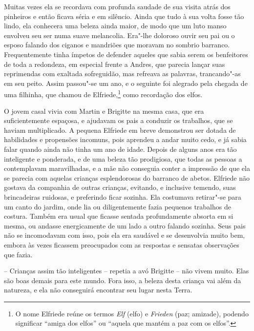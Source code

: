 Muitas vezes ela se recordava com profunda saudade de sua visita atrás
dos pinheiros e então ficava séria e em silêncio. Ainda que tudo à sua
volta fosse tão lindo, ela conhecera uma beleza ainda maior, de modo
que um luto manso envolveu seu ser numa suave melancolia. Era"-lhe
doloroso ouvir seu pai ou o esposo falando dos ciganos e mandriões que
moravam no sombrio barranco. Frequentemente tinha ímpetos de defender
aqueles que sabia serem os benfeitores de toda a redondeza, em especial
frente a Andres, que parecia lançar suas reprimendas com exaltada
sofreguidão, mas refreava as palavras, trancando"-as em seu peito. Assim
passou"-se um ano, e o seguinte foi alegrado pela chegada de uma
filhinha, que chamou de Elfriede,\footnote{ O nome Elfriede 
reúne os termos \textit{Elf} (elfo) e
\textit{Frieden} (paz; amizade), podendo significar ``amiga dos elfos'' ou
``aquela que mantém a paz com os elfos''.} como recordação dos elfos.

 O jovem casal vivia com Martin e Brigitte na mesma casa, que era
suficientemente espaçosa, e ajudavam os pais a conduzir os trabalhos,
que se haviam multiplicado. A pequena Elfriede em breve demonstrou ser
dotada de habilidades e propensões incomuns, pois aprendeu a andar
muito cedo, e já sabia falar quando ainda não tinha um ano de idade.
Depois de alguns anos era tão inteligente e ponderada, e de uma beleza
tão prodigiosa, que todas as pessoas a contemplavam maravilhadas, e a mãe
não conseguia conter a impressão de que ela se parecia com aquelas
crianças esplendorosas do barranco de abetos. Elfriede não gostava da
companhia de outras crianças, evitando, e inclusive temendo, suas
brincadeiras ruidosas, e preferindo ficar sozinha. Ela costumava
retirar"-se para um canto do jardim, onde lia ou diligentemente fazia
pequenos trabalhos de costura. Também era usual que ficasse sentada
profundamente absorta em si mesma, ou andasse energicamente de um lado
a outro falando sozinha. Seus pais não se incomodavam com isso, pois
ela era saudável e se desenvolvia muito bem, embora às vezes ficassem
preocupados com as respostas e sensatas observações que fazia.

-- Crianças assim tão inteligentes -- repetia a avó Brigitte -- não
vivem muito. Elas são boas demais para este mundo. Fora isso, a beleza
desta criança vai além da natureza, e ela não conseguirá encontrar seu
lugar nesta Terra.

